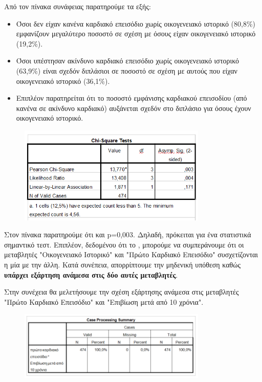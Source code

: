 Από τον πίνακα συνάφειας παρατηρούμε τα εξής: 
\begin{itemize}
    \item Όσοι δεν είχαν κανένα καρδιακό επεισόδιο χωρίς οικογενειακό ιστορικό (80,8\%) εμφανίζουν μεγαλύτερο ποσοστό σε σχέση με όσους είχαν οικογενειακό ιστορικό (19,2\%).
    \item Όσοι υπέστησαν ακίνδυνο καρδιακό επεισόδιο χωρίς οικογενειακό ιστορικό (63,9\%) είναι σχεδόν διπλάσιοι σε ποσοστό σε σχέση με αυτούς που είχαν οικογενειακό ιστορικό (36,1\%). 
    \item Επιπλέον παρατηρείται ότι το ποσοστό εμφάνισης καρδιακού επεισοδίου (από κανένα σε ακίνδυνο καρδιακό) αυξάνεται σχεδόν στο διπλάσιο για όσους έχουν οικογενειακό ιστορικό.
\end{itemize}

\begin{figure}[h]
    \centering
    \includegraphics[width=0.8\textwidth]{images/102.PNG}
\end{figure}

Στον πίνακα  παρατηρούμε ότι  και p=0,003. Δηλαδή, πρόκειται για ένα στατιστικά σημαντικό τεστ. Επιπλέον, δεδομένου ότι το ,  μπορούμε να συμπεράνουμε ότι οι μεταβλητές  "Οικογενειακό Ιστορικό" και "Πρώτο Καρδιακό Επεισόδιο" συσχετίζονται η μία με την άλλη. Κατά συνέπεια, απορρίπτουμε την μηδενική υπόθεση καθώς \textbf{υπάρχει εξάρτηση ανάμεσα στις δύο αυτές μεταβλητές}.

Στην συνέχεια θα μελετήσουμε την σχέση εξάρτησης ανάμεσα στις μεταβλητές "Πρώτο Καρδιακό Επεισόδιο" και "Επιβίωση μετά από 10 χρόνια". 

\begin{figure}[h]
    \centering
    \includegraphics[width=0.8\textwidth]{images/103.PNG}
\end{figure}

